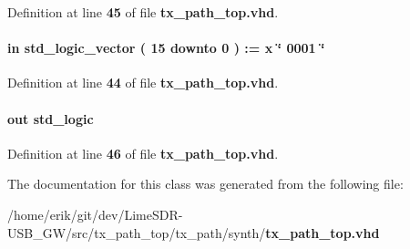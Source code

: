 Definition at line {\bf 45} of file {\bf tx\+\_\+path\+\_\+top.\+vhd}.

\paragraph[{txant\+\_\+cyc\+\_\+before\+\_\+en}]{ {\bfseries \textcolor{keywordflow}{in}\textcolor{vhdlchar}{ }} {\bfseries \textcolor{comment}{std\+\_\+logic\+\_\+vector}\textcolor{vhdlchar}{ }\textcolor{vhdlchar}{(}\textcolor{vhdlchar}{ }\textcolor{vhdlchar}{ } \textcolor{vhdldigit}{15} \textcolor{vhdlchar}{ }\textcolor{keywordflow}{downto}\textcolor{vhdlchar}{ }\textcolor{vhdlchar}{ } \textcolor{vhdldigit}{0} \textcolor{vhdlchar}{ }\textcolor{vhdlchar}{)}\textcolor{vhdlchar}{ }\textcolor{vhdlchar}{ }\textcolor{vhdlchar}{ }\textcolor{vhdlchar}{\+:}\textcolor{vhdlchar}{=}\textcolor{vhdlchar}{ }\textcolor{vhdlchar}{ }\textcolor{vhdlchar}{x}\textcolor{vhdlchar}{ }\textcolor{keyword}{\char`\"{} 0001 \char`\"{}}\textcolor{vhdlchar}{ }} \hspace{0.3cm}{\ttfamily [Port]}}\label{classtx__path__top_a87750f01cd43ed3ab89b2394190d0185}


Definition at line {\bf 44} of file {\bf tx\+\_\+path\+\_\+top.\+vhd}.

\paragraph[{txant\+\_\+en}]{ {\bfseries \textcolor{keywordflow}{out}\textcolor{vhdlchar}{ }} {\bfseries \textcolor{comment}{std\+\_\+logic}\textcolor{vhdlchar}{ }} \hspace{0.3cm}{\ttfamily [Port]}}\label{classtx__path__top_aba43bfcb5d3126b6d305800a684bd902}


Definition at line {\bf 46} of file {\bf tx\+\_\+path\+\_\+top.\+vhd}.



The documentation for this class was generated from the following file\+:\begin{DoxyCompactItemize}
\item 
/home/erik/git/dev/\+Lime\+S\+D\+R-\/\+U\+S\+B\+\_\+\+G\+W/src/tx\+\_\+path\+\_\+top/tx\+\_\+path/synth/{\bf tx\+\_\+path\+\_\+top.\+vhd}\end{DoxyCompactItemize}
